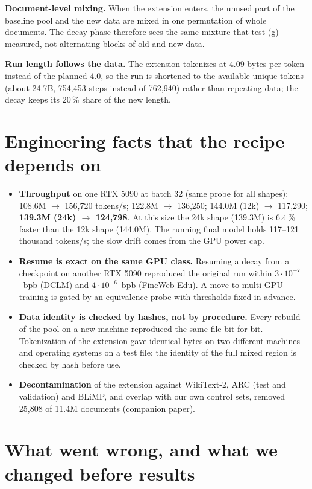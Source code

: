 \textbf{Document-level mixing.} When the extension enters, the unused part of the baseline pool and the new data are
mixed in one permutation of whole documents. The decay phase therefore sees the same mixture that test (g) measured,
not alternating blocks of old and new data.

\textbf{Run length follows the data.} The extension tokenizes at 4.09 bytes per token instead of the planned 4.0, so
the run is shortened to the available unique tokens (about 24.7B, 754,453 steps instead of 762,940) rather than repeating data; the decay keeps its 20\,\%
share of the new length.

\section{Engineering facts that the recipe depends on}

\begin{itemize}
  \item \textbf{Throughput} on one RTX 5090 at batch 32 (same probe for all shapes): 108.6M $\to$ 156,720 tokens/s;
  122.8M $\to$ 136,250; 144.0M (12k) $\to$ 117,290; \textbf{139.3M (24k) $\to$ 124,798}. At this size the 24k shape
  (139.3M) is 6.4\,\% faster than the 12k shape (144.0M). The running final model holds 117--121 thousand tokens/s;
  the slow drift comes from the GPU power cap.
  \item \textbf{Resume is exact on the same GPU class.} Resuming a decay from a checkpoint on another RTX 5090
  reproduced the original run within $3\cdot10^{-7}$~bpb (DCLM) and $4\cdot10^{-6}$~bpb (FineWeb-Edu). A move to
  multi-GPU training is gated by an equivalence probe with thresholds fixed in advance.
  \item \textbf{Data identity is checked by hashes, not by procedure.} Every rebuild of the pool on a new machine
  reproduced the same file bit for bit. Tokenization of the extension gave identical bytes on two different machines
  and operating systems on a test file; the identity of the full mixed region is checked by hash before use.
  \item \textbf{Decontamination} of the extension against WikiText-2, ARC (test and validation) and BLiMP, and overlap
  with our own control sets, removed 25,808 of 11.4M documents (companion paper).
\end{itemize}

\section{What went wrong, and what we changed before results}
\label{sec:changed}

